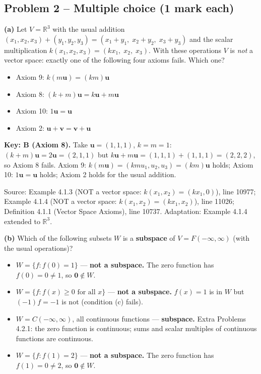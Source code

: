 \documentclass[11pt,a4paper]{article}
\newcommand{\Src}[1]{{\footnotesize\color{black!65}Source: #1}}
\begin{document}
\subsection*{Problem 2 -- Multiple choice (1 mark each)}
\textbf{(a)} Let $V=\mathbb{R}^3$ with the usual addition $(x_1,x_2,x_3)+(y_1,y_2,y_3)=(x_1+y_1,\;x_2+y_2,\;x_3+y_3)$ and the scalar multiplication $k(x_1,x_2,x_3)=(kx_1,\;x_2,\;x_3)$. With these operations $V$ is \emph{not} a vector space: exactly one of the following four axioms fails. Which one?\par
\begin{itemize}[leftmargin=8mm,itemsep=0pt]\item[A] Axiom 9: $k(m\mathbf{u})=(km)\mathbf{u}$\item[B$^{\ast}$] Axiom 8: $(k+m)\mathbf{u}=k\mathbf{u}+m\mathbf{u}$\item[C] Axiom 10: $1\mathbf{u}=\mathbf{u}$\item[D] Axiom 2: $\mathbf{u}+\mathbf{v}=\mathbf{v}+\mathbf{u}$\end{itemize}
\textbf{Key: B (Axiom 8).} Take $\mathbf{u}=(1,1,1)$, $k=m=1$: $(k+m)\mathbf{u}=2\mathbf{u}=(2,1,1)$ but $k\mathbf{u}+m\mathbf{u}=(1,1,1)+(1,1,1)=(2,2,2)$, so Axiom 8 fails. Axiom 9: $k(m\mathbf{u})=(kmu_1,u_2,u_3)=(km)\mathbf{u}$ holds; Axiom 10: $1\mathbf{u}=\mathbf{u}$ holds; Axiom 2 holds for the usual addition.\par
\Src{Example 4.1.3 (NOT a vector space: $k(x_1,x_2)=(kx_1,0)$), line 10977; Example 4.1.4 (NOT a vector space: $k(x_1,x_2)=(kx_1,x_2)$), line 11026; Definition 4.1.1 (Vector Space Axioms), line 10737. Adaptation: Example 4.1.4 extended to $\mathbb{R}^3$.}\par
\textbf{(b)} Which of the following subsets $W$ is a \textbf{subspace} of $V=F(-\infty,\infty)$ (with the usual operations)?\par
\begin{itemize}[leftmargin=8mm,itemsep=0pt]\item[A] $W=\{f : f(0)=1\}$ --- \textbf{not a subspace.} The zero function has $f(0)=0\neq1$, so $\mathbf{0}\notin W$.\item[B] $W=\{f : f(x)\ge0 \text{ for all } x\}$ --- \textbf{not a subspace.} $f(x)=1$ is in $W$ but $(-1)f=-1$ is not (condition (c) fails).\item[C$^{\ast}$] $W=C(-\infty,\infty)$, all continuous functions --- \textbf{subspace.} Extra Problems 4.2.1: the zero function is continuous; sums and scalar multiples of continuous functions are continuous.\item[D] $W=\{f : f(1)=2\}$ --- \textbf{not a subspace.} The zero function has $f(1)=0\neq2$, so $\mathbf{0}\notin W$.\end{itemize}
\end{document}
